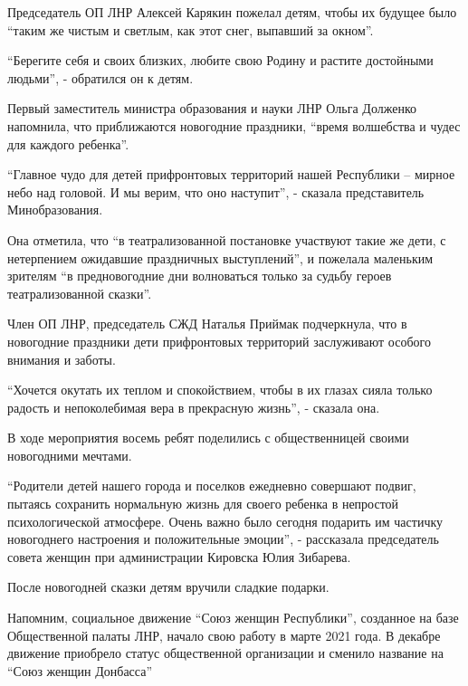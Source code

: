 Председатель ОП ЛНР Алексей Карякин пожелал детям, чтобы их будущее было \enquote{таким
же чистым и светлым, как этот снег, выпавший за окном}.

\enquote{Берегите себя и своих близких, любите свою Родину и растите достойными
людьми}, - обратился он к детям.

Первый заместитель министра образования и науки ЛНР Ольга Долженко напомнила,
что приближаются новогодние праздники, \enquote{время волшебства и чудес для каждого
ребенка}.

\enquote{Главное чудо для детей прифронтовых территорий нашей Республики – мирное небо
над головой. И мы верим, что оно наступит}, - сказала представитель
Минобразования.

Она отметила, что \enquote{в театрализованной постановке участвуют такие же дети, с
нетерпением ожидавшие праздничных выступлений}, и пожелала маленьким зрителям
\enquote{в предновогодние дни волноваться только за судьбу героев театрализованной
сказки}.

Член ОП ЛНР, председатель СЖД Наталья Приймак подчеркнула, что в новогодние
праздники дети прифронтовых территорий заслуживают особого внимания и заботы.

\enquote{Хочется окутать их теплом и спокойствием, чтобы в их глазах сияла только
радость и непоколебимая вера в прекрасную жизнь}, - сказала она.

В ходе мероприятия восемь ребят поделились с общественницей своими новогодними
мечтами.

\enquote{Родители детей нашего города и поселков ежедневно совершают подвиг, пытаясь
сохранить нормальную жизнь для своего ребенка в непростой психологической
атмосфере. Очень важно было сегодня подарить им частичку новогоднего настроения
и положительные эмоции}, - рассказала председатель совета женщин при
администрации Кировска Юлия Зибарева.

После новогодней сказки детям вручили сладкие подарки.

Напомним, социальное движение \enquote{Союз женщин Республики}, созданное на базе
Общественной палаты ЛНР, начало свою работу в марте 2021 года. В декабре
движение приобрело статус общественной организации и сменило название на \enquote{Союз
женщин Донбасса}
